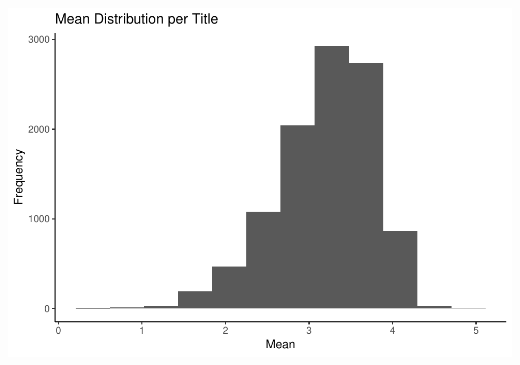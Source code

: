 \documentclass[]{article}
\begin{document}
\begin{center}\includegraphics{MovieLens_Project_Report_files/figure-latex/unnamed-chunk-22-1} \end{center}
\end{document}

